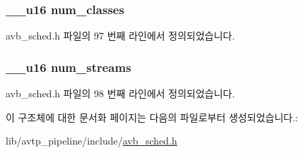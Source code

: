\subsubsection[{\texorpdfstring{num\+\_\+classes}{num_classes}}]{\setlength{\rightskip}{0pt plus 5cm}\+\_\+\+\_\+u16 num\+\_\+classes}\hypertarget{structtc__avb__qopt_afe0162ad6ffb28468a07237911cf16e5}{}\label{structtc__avb__qopt_afe0162ad6ffb28468a07237911cf16e5}


avb\+\_\+sched.\+h 파일의 97 번째 라인에서 정의되었습니다.

\subsubsection[{\texorpdfstring{num\+\_\+streams}{num_streams}}]{\setlength{\rightskip}{0pt plus 5cm}\+\_\+\+\_\+u16 num\+\_\+streams}\hypertarget{structtc__avb__qopt_a003afbc4ed1d684d12bd6ac993b953f4}{}\label{structtc__avb__qopt_a003afbc4ed1d684d12bd6ac993b953f4}


avb\+\_\+sched.\+h 파일의 98 번째 라인에서 정의되었습니다.



이 구조체에 대한 문서화 페이지는 다음의 파일로부터 생성되었습니다.\+:\begin{DoxyCompactItemize}
\item 
lib/avtp\+\_\+pipeline/include/\hyperlink{avb__sched_8h}{avb\+\_\+sched.\+h}\end{DoxyCompactItemize}
